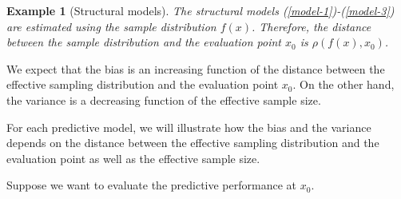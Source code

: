 \documentclass{article}
\newtheorem{example}{Example}
\begin{document}
\begin{example}[Structural models]

The structural models (\ref{model-1})-(\ref{model-3}) are estimated using the sample distribution $f(x)$. Therefore, the distance between the sample distribution and the evaluation point $x_0$ is $\rho(f(x),x_0)$.



\end{example}

We expect that the bias is an increasing function of the distance between the effective sampling distribution and the evaluation point $x_0$. On the other hand, the variance is a decreasing function of the effective sample size.

For each predictive model, we will illustrate how the bias and the variance depends on  the distance between the effective sampling distribution  and the evaluation point as well as the effective sample size.





Suppose we want to evaluate the predictive performance at $x_0$.
\end{document}
